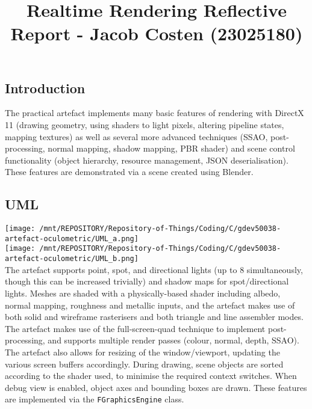 \documentclass[
]{article}
\title{Realtime Rendering Reflective Report - Jacob Costen (23025180)}
\author{}
\date{}
\begin{document}
\maketitle

\hypertarget{realtime-rendering-reflective-report---jacob-costen-23025180}{%

\hypertarget{introduction}{%
\subsection{Introduction}\label{introduction}}

The practical artefact implements many basic features of rendering with
DirectX 11 (drawing geometry, using shaders to light pixels, altering
pipeline states, mapping textures) as well as several more advanced
techniques (SSAO, post-processing, normal mapping, shadow mapping, PBR
shader) and scene control functionality (object hierarchy, resource
management, JSON deserialisation). These features are demonstrated via a
scene created using Blender.

\hypertarget{uml}{%
\subsection{UML}\label{uml}}

\texttt{[image: /mnt/REPOSITORY/Repository-of-Things/Coding/C/gdev50038-artefact-oculometric/UML\_a.png]}\\
\newline
\texttt{[image: /mnt/REPOSITORY/Repository-of-Things/Coding/C/gdev50038-artefact-oculometric/UML\_b.png]}\\
The artefact supports point, spot, and directional lights (up to 8
simultaneously, though this can be increased trivially) and shadow maps for spot/directional lights. Meshes are
shaded with a physically-based shader including albedo, normal mapping, roughness and metallic inputs, and the artefact makes use of both solid and wireframe rasterisers and both triangle and line assembler modes. The artefact makes use of the full-screen-quad technique to implement post-processing, and supports multiple render passes (colour, normal, depth, SSAO). The artefact also allows for resizing of the window/viewport, updating the various screen buffers accordingly. During drawing, scene objects are
sorted according to the shader used, to minimise the required context
switches. When debug view is enabled, object axes and bounding boxes are
drawn. These features are implemented via the \texttt{FGraphicsEngine}
class.

}
\end{document}

